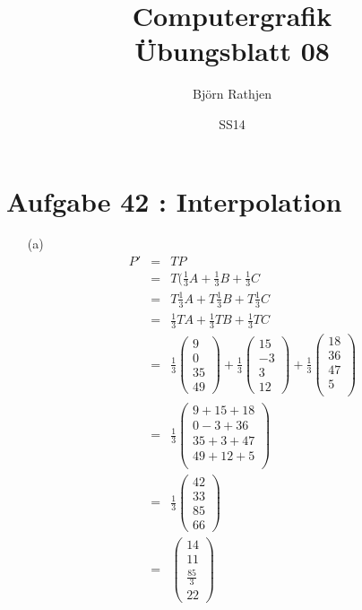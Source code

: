 \documentclass[11pt]{article}
\title{Computergrafik\\Übungsblatt 08}
\author{Björn Rathjen}
\date{SS14}
\begin{document}
\maketitle
\newpage
\section{Aufgabe 42 : Interpolation}
\begin{itemize}
\item[(a)]
 \begin{eqnarray}
P' &=& T P \\
&=& T ( \frac{1}{3} A + \frac{1}{3} B + \frac{1}{3} C \\
&=& T \frac{1}{3} A + T\frac{1}{3} B + T\frac{1}{3} C \\
&=& \frac{1}{3} TA + \frac{1}{3} TB + \frac{1}{3} TC \\
&=& \frac{1}{3} \begin{pmatrix}
9 \\ 0 \\ 35 \\49 
\end{pmatrix} + \frac{1}{3} 
\begin{pmatrix}
15 \\ -3 \\ 3 \\ 12 
\end{pmatrix} + \frac{1}{3}
\begin{pmatrix}
18 \\ 36 \\ 47 \\ 5 \\
\end{pmatrix} \\
&=& \frac{1}{3} \begin{pmatrix} 9 + 15 + 18\\
0 - 3 + 36 \\
35 + 3 + 47 \\
49 + 12 + 5 \\
\end{pmatrix}\\
&=& \frac{1}{3} \begin{pmatrix}
42 \\ 33 \\ 85 \\ 66 
\end{pmatrix}\\
&=& \begin{pmatrix}
14 \\ 11 \\ \frac{85}{3} \\ 22 

\end{pmatrix}
\end{eqnarray}
\end{itemize}
\end{document}
